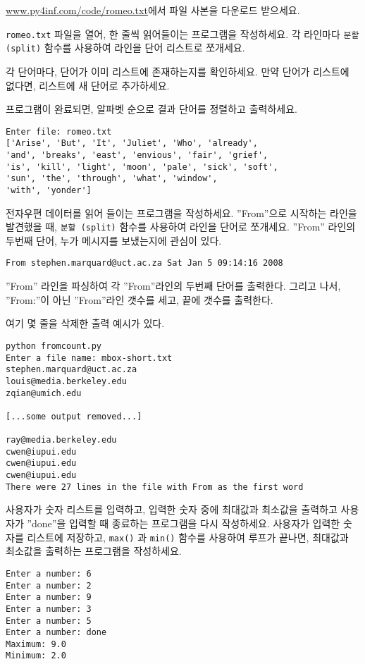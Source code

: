 \begin{ex}


\url{www.py4inf.com/code/romeo.txt}에서 파일 사본을 다운로드 받으세요.

{\tt romeo.txt} 파일을 열어, 한 줄씩 읽어들이는 프로그램을 작성하세요.
각 라인마다 {\tt 분할 (split)} 함수를 사용하여 라인을 단어 리스트로 쪼개세요.

각 단어마다, 단어가 이미 리스트에 존재하는지를 확인하세요. 
만약 단어가 리스트에 없다면, 리스트에 새 단어로 추가하세요.

프로그램이 완료되면, 알파벳 순으로 결과 단어를 정렬하고 출력하세요.

\begin{verbatim}
Enter file: romeo.txt
['Arise', 'But', 'It', 'Juliet', 'Who', 'already', 
'and', 'breaks', 'east', 'envious', 'fair', 'grief', 
'is', 'kill', 'light', 'moon', 'pale', 'sick', 'soft', 
'sun', 'the', 'through', 'what', 'window', 
'with', 'yonder']
\end{verbatim}
\end{ex}

\begin{ex}

전자우편 데이터를 읽어 들이는 프로그램을 작성하세요.
''From''으로 시작하는 라인을 발견했을 때, {\tt 분할 (split)} 함수를 사용하여 라인을 단어로 쪼개세요.
''From'' 라인의 두번째 단어, 누가 메시지를 보냈는지에 관심이 있다.

{\tt From stephen.marquard@uct.ac.za Sat Jan  5 09:14:16 2008 }

''From'' 라인을 파싱하여 각 ''From''라인의 두번째 단어를 출력한다.
그리고 나서, ''From:''이 아닌 ''From''라인 갯수를 세고, 끝에 갯수를 출력한다.

여기 몇 줄을 삭제한 출력 예시가 있다.

\beforeverb
\begin{verbatim}
python fromcount.py 
Enter a file name: mbox-short.txt
stephen.marquard@uct.ac.za
louis@media.berkeley.edu
zqian@umich.edu

[...some output removed...]

ray@media.berkeley.edu
cwen@iupui.edu
cwen@iupui.edu
cwen@iupui.edu
There were 27 lines in the file with From as the first word
\end{verbatim}
\afterverb
%
\end{ex}

\begin{ex}

사용자가 숫자 리스트를 입력하고, 입력한 숫자 중에 최대값과 최소값을 출력하고 사용자가 ''done''을 입력할 때 종료하는 프로그램을 다시 작성하세요.
사용자가 입력한 숫자를 리스트에 저장하고, {\tt max()} 과 {\tt min()} 함수를 사용하여 루프가 끝나면, 최대값과 최소값을 출력하는 프로그램을 작성하세요.

\beforeverb
\begin{verbatim}
Enter a number: 6
Enter a number: 2
Enter a number: 9
Enter a number: 3
Enter a number: 5
Enter a number: done
Maximum: 9.0
Minimum: 2.0
\end{verbatim}
\afterverb
%

\end{ex}

